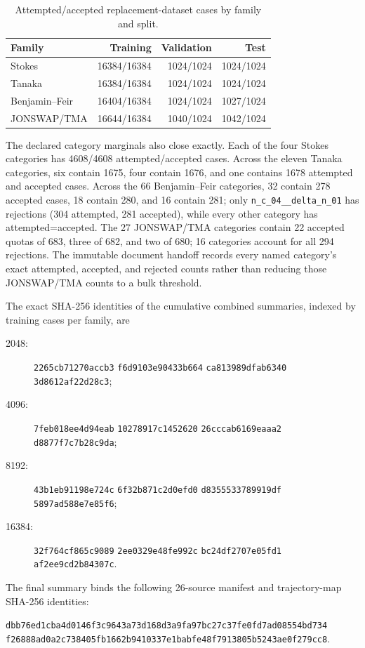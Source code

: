 \begin{table}[t]
  \centering
  \caption{Attempted/accepted replacement-dataset cases by family and split.}
  \label{tab:replacement-family-split-counts}
  \begin{tabular}{lrrr}
    \toprule
    Family & Training & Validation & Test\\
    \midrule
    Stokes & 16384/16384 & 1024/1024 & 1024/1024\\
    Tanaka & 16384/16384 & 1024/1024 & 1024/1024\\
    Benjamin--Feir & 16404/16384 & 1024/1024 & 1027/1024\\
    JONSWAP/TMA & 16644/16384 & 1040/1024 & 1042/1024\\
    \bottomrule
  \end{tabular}
\end{table}

The declared category marginals also close exactly.  Each of the four Stokes
categories has \num{4608}/\num{4608} attempted/accepted cases.  Across the
eleven Tanaka categories, six contain \num{1675}, four contain \num{1676}, and
one contains \num{1678} attempted and accepted cases.  Across the 66
Benjamin--Feir categories, 32 contain 278 accepted cases, 18 contain 280, and
16 contain 281; only \texttt{n\_c\_04\_\_delta\_n\_01} has rejections
(304 attempted, 281 accepted), while every other category has
attempted=accepted.  The 27 JONSWAP/TMA categories contain 22 accepted quotas
of 683, three of 682, and two of 680; 16 categories account for all 294
rejections.  The immutable document handoff records every named category's
exact attempted, accepted, and rejected counts rather than reducing those
JONSWAP/TMA counts to a bulk threshold.

The exact SHA-256 identities of the cumulative combined summaries, indexed by
training cases per family, are
\begin{description}
  \item[2048:] \texttt{2265cb71270accb3}\allowbreak
    \texttt{f6d9103e90433b664}\allowbreak
    \texttt{ca813989dfab6340}\allowbreak
    \texttt{3d8612af22d28c3};
  \item[4096:] \texttt{7feb018ee4d94eab}\allowbreak
    \texttt{10278917c1452620}\allowbreak
    \texttt{26cccab6169eaaa2}\allowbreak
    \texttt{d8877f7c7b28c9da};
  \item[8192:] \texttt{43b1eb91198e724c}\allowbreak
    \texttt{6f32b871c2d0efd0}\allowbreak
    \texttt{d8355533789919df}\allowbreak
    \texttt{5897ad588e7e85f6};
  \item[16384:] \texttt{32f764cf865c9089}\allowbreak
    \texttt{2ee0329e48fe992c}\allowbreak
    \texttt{bc24df2707e05fd1}\allowbreak
    \texttt{af2ee9cd2b84307c}.
\end{description}
The final summary binds the following 26-source manifest and trajectory-map
SHA-256 identities:
\begin{center}
\small
\texttt{dbb76ed1cba4d0146f3c9643a73d168d3a9fa97bc27c37fe0fd7ad08554bd734}\\
\texttt{f26888ad0a2c738405fb1662b9410337e1babfe48f7913805b5243ae0f279cc8}.
\end{center}

